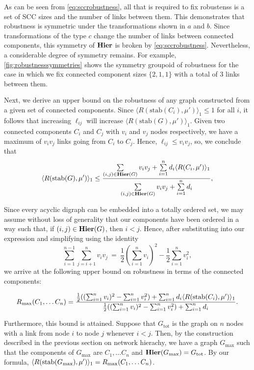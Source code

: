 As can be seen from \ref{eq:sccrobustness}, all that is required to fix robustenss is a set of SCC sizes and the number of links between them. This demonstrates that robustness is symmetric under the transformations shown in  $a$ and $b$. Since transformations of the type  $c$ change the number of links between connected components, this symmetry of $\mathbf{Hier}$ is broken by \ref{eq:sccrobustness}. Nevertheless, a considerable degree of symmetry remains. For example, \ref{fig:robustnesssymmetries} shows the symmetry groupoid of robustness for the case in which we fix connected component sizes $\{2,1,1\}$ with a total of $3$ links between them.

Next, we derive an upper bound on the robustness of any graph
constructed from a given set of connected components.  Since
$\langle R(\textrm{stab}(C_i), \mu') \rangle_1 \le 1$ for all $i$, it follows that increasing $\ell_{ij}$ will
increase $\langle R(\textrm{stab}(G),\mu') \rangle_1$.  Given two connected components $C_i$ and $C_j$ with
$v_i$ and $v_j$ nodes respectively, we have a maximum of $v_i v_j$
links going from $C_i$ to $C_j$.  Hence, $\ell_{ij} \le v_i v_j$, so,
we conclude that
\begin{align}
\langle R(\textrm{stab}(G),\mu') \rangle_1 \le \frac{\sum\limits_{(i,j) \in \mathbf{Hier}(G)} v_i v_j +
               \sum\limits_{i=1}^n d_i \langle R(C_i,\mu') \rangle_1}
              {\sum\limits_{(i,j) \in \mathbf{Hier}(G)} v_i v_j +
               \sum\limits_{i=1}^n d_i},
\end{align}

Since every acyclic digraph can be embedded into a totally ordered
set, we may assume without loss of generality that our components have
been ordered in a way such that, if $(i,j) \in \mathbf{Hier}(G)$, then $i <
j$.  Hence, after substituting into our expression and simplifying
using the identity
$$\sum_{i=1}^{n-1}\sum_{j=i+1}^{n}v_i
v_j~=~\frac{1}{2} \left( \sum_{i=1}^{n} v_i \right)^2-\frac{1}{2} \sum_{i=1}^{n}
v_i^2,$$
we arrive at the following upper bound on robustness in terms
of the connected components:
\begin{widetext}
\begin{align} \label{eq:sccmaxrobustness}
R_{\mathrm{max}}(C_1, \ldots C_n) =
\frac{\frac{1}{2} ((\sum_{i=1}^n v_i)^2 - \sum_{i=1}^n v_i^2) +
                    \sum_{i=1}^n d_i \langle R(\hbox{stab}(C_i),\mu') \rangle_1}
     {\frac{1}{2} ((\sum_{i=1}^n v_i)^2 - \sum_{i=1}^n v_i^2) +
                    \sum_{i=1}^n d_i}.
\end{align}
\end{widetext}
Furthermore, this bound is attained.  Suppose that $G_{\mathrm{tot}}$
is the graph on $n$ nodes with a link from node $i$ to node $j$
whenever $i < j$.  Then, by the construction described in the previous
section on network hierachy, we have a graph $G_{\mathrm{max}}$ such
that the components of $G_{\mathrm{max}}$ are $C_1, \ldots C_n$ and
$\mathbf{Hier} (G_{\mathrm{max}}) = G_{\mathrm{tot}}$.  By our formula,
$\langle R(\hbox{stab} (G_{\mathrm{max}}), \mu') \rangle_1 = R_{\mathrm{max}}(C_1, \ldots C_n)$.


